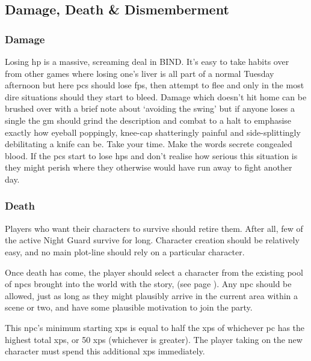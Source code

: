 \begin{multicols}{2}

\subsection{Damage, Death \& Dismemberment}

\subsubsection{Damage}

Losing \gls{hp} is a massive, screaming deal in BIND.
It's easy to take habits over from other games where losing one's liver is all part of a normal Tuesday afternoon but here \glspl{pc} should lose \glspl{fp}, then attempt to flee and only in the most dire situations should they start to bleed.
Damage which doesn't hit home can be brushed over with a brief note about `avoiding the swing' but if anyone loses a single  the \gls{gm} should grind the description and combat to a halt to emphasise exactly how eyeball poppingly, knee-cap shatteringly painful and side-splittingly debilitating a knife can be.
Take your time.
Make the words secrete congealed blood.
If the \glspl{pc} start to lose \glspl{hp} and don't realise how serious this situation is they might perish where they otherwise would have run away to fight another day.

\subsubsection{Death}
\label{pcdeath}

Players who want their characters to survive should retire them.
After all, few of the active Night Guard survive for long.
Character creation should be relatively easy, and no main plot-line should rely on a particular character.

Once death has come, the player should select a character from the existing pool of \glspl{npc} brought into the world with the story,  (see page \pageref{oldnpc}).
Any \gls{npc} should be allowed, just as long as they might plausibly arrive in the current area within a scene or two, and have some plausible motivation to join the party.

This \gls{npc}'s minimum starting \glspl{xp} is equal to half the \glspl{xp} of whichever \gls{pc} has the highest total \glspl{xp}, or 50 \glspl{xp} (whichever is greater).
The player taking on the new character must spend this additional \glspl{xp} immediately.


\end{multicols}
